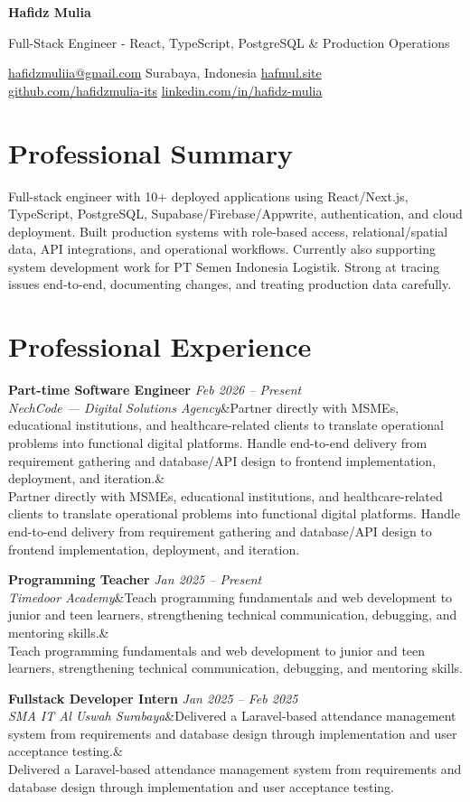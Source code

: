 \documentclass[a4paper,10.5pt]{article}
\newcommand{\cvname}[1]{{\centering\LARGE\bfseries #1\par\vspace{1pt}}}
\newcommand{\cvtitle}[1]{{\centering\normalsize\color{accent} #1\par\vspace{2pt}}}
\newcommand{\cvcontact}[1]{{\centering\small #1\par\vspace{4pt}}}
\newcommand{\cventry}[4]{\noindent\textbf{#1} \hfill \textit{#3} \\\textit{#2}\ifx&#4& \else \\ {\small #4} \fi\vspace{4pt}}
\begin{document}
\cvname{Hafidz Mulia}
\cvtitle{Full-Stack Engineer - React, TypeScript, PostgreSQL \& Production Operations}
\cvcontact{\href{mailto:hafidzmuliia@gmail.com}{hafidzmuliia@gmail.com} \quad\textbar\quad Surabaya, Indonesia \quad\textbar\quad \href{https://hafmul.site}{hafmul.site} \\
\href{https://github.com/hafidzmulia-its}{github.com/hafidzmulia-its} \quad\textbar\quad \href{https://www.linkedin.com/in/hafidz-mulia/}{linkedin.com/in/hafidz-mulia}}

\section{Professional Summary}
Full-stack engineer with 10+ deployed applications using React/Next.js, TypeScript, PostgreSQL, Supabase/Firebase/Appwrite, authentication, and cloud deployment. Built production systems with role-based access, relational/spatial data, API integrations, and operational workflows. Currently also supporting system development work for PT Semen Indonesia Logistik. Strong at tracing issues end-to-end, documenting changes, and treating production data carefully.

\section{Professional Experience}
\cventry
  {Part-time Software Engineer}
  {NechCode --- Digital Solutions Agency}
  {Feb 2026 -- Present}
  {Partner directly with MSMEs, educational institutions, and healthcare-related clients to translate operational problems into functional digital platforms. Handle end-to-end delivery from requirement gathering and database/API design to frontend implementation, deployment, and iteration.}

\cventry
  {Programming Teacher}
  {Timedoor Academy}
  {Jan 2025 -- Present}
  {Teach programming fundamentals and web development to junior and teen learners, strengthening technical communication, debugging, and mentoring skills.}

\cventry
  {Fullstack Developer Intern}
  {SMA IT Al Uswah Surabaya}
  {Jan 2025 -- Feb 2025}
  {Delivered a Laravel-based attendance management system from requirements and database design through implementation and user acceptance testing.}
\end{document}
